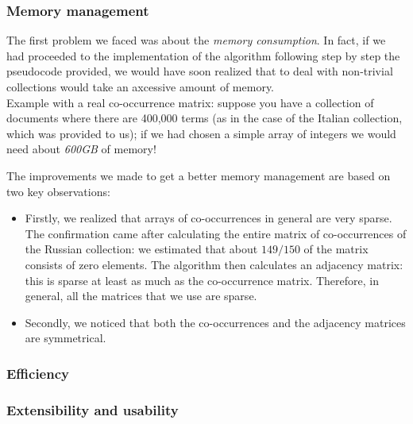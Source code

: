         \subsubsection{Memory management}
            The first problem we faced was about the \emph{memory consumption}. In fact, if we had proceeded to the implementation of the algorithm following step by step the pseudocode provided, we would have soon realized that to deal with non-trivial collections would take an axcessive amount of memory.\\
            Example with a real co-occurrence matrix: suppose you have a collection of documents where there are 400,000 terms (as in the case of the Italian collection, which was provided to us); if we had chosen a simple array of integers we would need about \emph{600GB} of memory!\par
            The improvements we made to get a better memory management are based on two key observations:
            \begin{itemize}
                \item Firstly, we realized that arrays of co-occurrences in general are very sparse. The confirmation came after calculating the entire matrix of co-occurrences of the Russian collection: we estimated that about \(149/150\) of the matrix consists of zero elements. The algorithm then calculates an adjacency matrix: this is sparse at least as much as the co-occurrence matrix. Therefore, in general, all the matrices that we use are sparse.
                \item Secondly, we noticed that both the co-occurrences and the adjacency matrices are symmetrical.
            \end{itemize}
        \subsubsection{Efficiency}
        \subsubsection{Extensibility and usability}